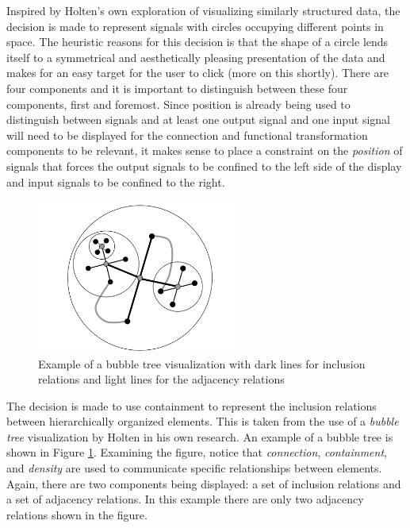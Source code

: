 Inspired by Holten's own exploration of visualizing similarly structured data, the decision is made to represent signals with circles occupying different points in space. The heuristic reasons for this decision is that the shape of a circle lends itself to a symmetrical and aesthetically pleasing presentation of the data and makes for an easy target for the user to click (more on this shortly). There are four components and it is important to distinguish between these four components, first and foremost. Since position is already being used to distinguish between signals and at least one output signal and one input signal will need to be displayed for the connection and functional transformation components to be relevant, it makes sense to place a constraint on the \emph{position} of signals that forces the output signals to be confined to the left side of the display and input signals to be confined to the right.

\begin{figure}[htb]
\centering
\includegraphics[width=0.6\textwidth]{holten_bubble.png}
\caption{Example of a bubble tree visualization with dark lines for inclusion relations and light lines for the adjacency relations}
\label{fig:balloonTree}
\end{figure}

The decision is made to use containment to represent the inclusion relations between hierarchically organized elements. This is taken from the use of a \emph{bubble tree} visualization by Holten in his own research. An example of a bubble tree is shown in Figure \ref{fig:balloonTree}. Examining the figure, notice that \emph{connection}, \emph{containment}, and \emph{density} are used to communicate specific relationships between elements. Again, there are two components being displayed: a set of inclusion relations and a set of adjacency relations. In this example there are only two adjacency relations shown in the figure. 

